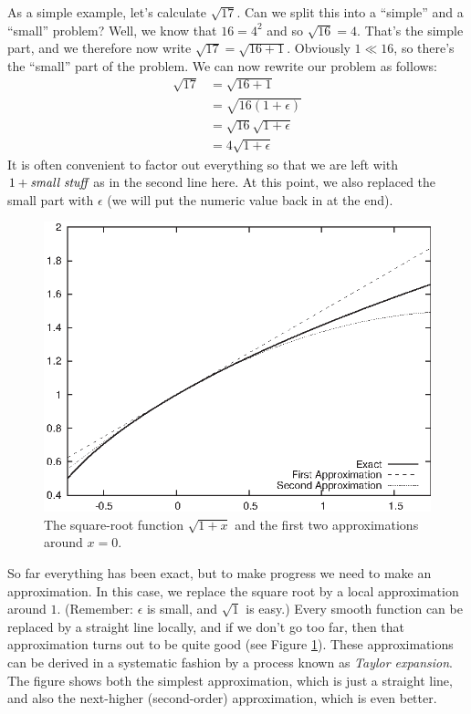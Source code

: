 As a simple example, let's calculate $\sqrt{17}$. Can we split this
into a ``simple'' and a ``small'' problem? Well, we know that $16 =
4^2$ and so $\sqrt{16} = 4$. That's the simple part, and we therefore
now write $\sqrt{17} = \sqrt{16+1}$.  Obviously $1 \ll 16$, so there's
the ``small'' part of the problem.  We can now rewrite our problem as
follows:
%
\begin{align*}
\sqrt{17} & = \sqrt{16 + 1} \\
          & = \sqrt{16 ( 1 + \epsilon ) } \\
          & = \sqrt{16} \sqrt{1+\epsilon} \\
          & = 4 \sqrt{1+\epsilon}  
\end{align*}
%
It is often convenient to factor out everything so that we are left
with $1 + \text{\itshape small stuff}$ as in the second line here.  At
this point, we also replaced the small part with $\epsilon$ (we will
put the numeric value back in at the end).

\begin{figure}
  \centerline{\includegraphics{img/perturb1}}
  \caption{The square-root function $\sqrt{1+x}$ and the first two 
    approximations around $x=0$.}
  \label{fig:perturb1}
\end{figure}

So far everything has been exact, but to make progress we need to make
an approximation. In this case, we replace the square root by a local
approximation around $1$. (Remember: $\epsilon$ is small,  and
$\sqrt{1}$ is easy.) Every smooth function can be replaced by a
straight line locally, and if we don't go too far, then that
approximation turns out to be quite good (see Figure
\ref{fig:perturb1}). These approximations can be derived in a
systematic fashion by a process known as \emph{Taylor expansion}. The
figure shows both the simplest approximation, which is just a straight
line, and also the next-higher (second-order) approximation, which is
even better.

